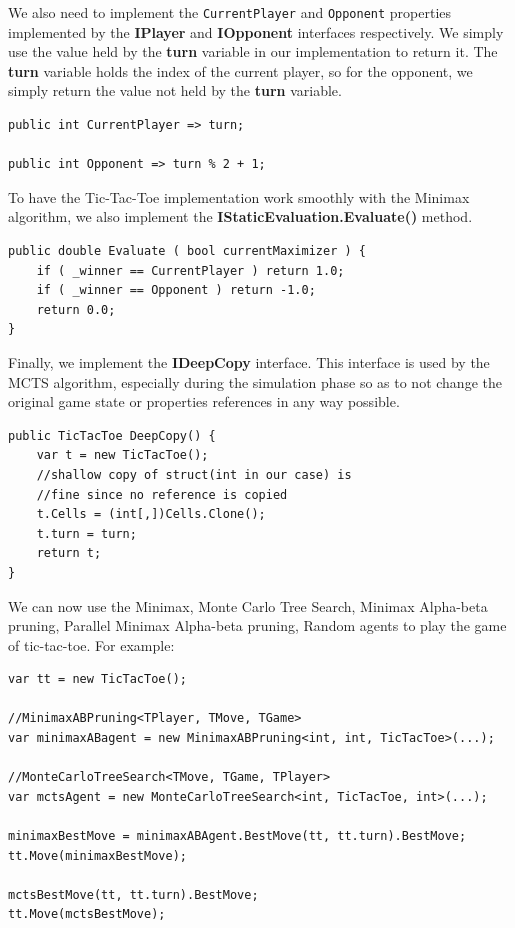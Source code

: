 We also need to implement the \texttt{CurrentPlayer} and \texttt{Opponent} properties implemented by the \textbf{IPlayer} and \textbf{IOpponent} interfaces respectively. We simply use the value held by the \textbf{turn} variable in our implementation to return it. The \textbf{turn} variable holds the index of the current player, so for the opponent, we simply return the value not held by the \textbf{turn} variable.

\begin{lstlisting}
public int CurrentPlayer => turn;

public int Opponent => turn % 2 + 1;    
\end{lstlisting}

To have the Tic-Tac-Toe implementation work smoothly with the Minimax algorithm, we also implement the \textbf{IStaticEvaluation.Evaluate()} method.
\begin{lstlisting}
public double Evaluate ( bool currentMaximizer ) {
    if ( _winner == CurrentPlayer ) return 1.0;
    if ( _winner == Opponent ) return -1.0;
    return 0.0;
}
\end{lstlisting}

Finally, we implement the \textbf{IDeepCopy} interface. This interface is used by the \gls{MCTS} algorithm, especially during the simulation phase so as to not change the original game state or properties references in any way possible.

\begin{lstlisting}
public TicTacToe DeepCopy() {
    var t = new TicTacToe();
    //shallow copy of struct(int in our case) is
    //fine since no reference is copied
    t.Cells = (int[,])Cells.Clone();
    t.turn = turn;
    return t;
}
\end{lstlisting}

We can now use the Minimax, Monte Carlo Tree Search, Minimax Alpha-beta pruning, Parallel Minimax Alpha-beta pruning, Random agents to play the game of tic-tac-toe. For example:

\begin{lstlisting}
var tt = new TicTacToe();

//MinimaxABPruning<TPlayer, TMove, TGame>
var minimaxABagent = new MinimaxABPruning<int, int, TicTacToe>(...);

//MonteCarloTreeSearch<TMove, TGame, TPlayer>
var mctsAgent = new MonteCarloTreeSearch<int, TicTacToe, int>(...);

minimaxBestMove = minimaxABAgent.BestMove(tt, tt.turn).BestMove;
tt.Move(minimaxBestMove);

mctsBestMove(tt, tt.turn).BestMove;
tt.Move(mctsBestMove);
\end{lstlisting}

